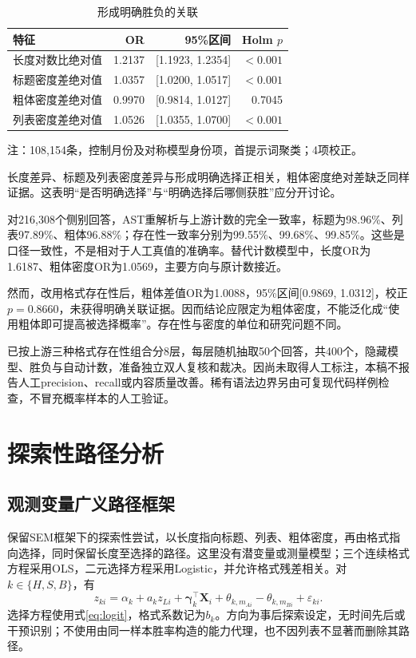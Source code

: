 \documentclass[UTF8,11pt,a4paper,fontset=windows]{ctexart}
\numberwithin{equation}{section}
\begin{document}
\begin{table}[htbp]\centering\small\caption{形成明确胜负的关联}\label{tab:decisive}
\begin{tabular}{lrrr}\toprule
特征 & OR & 95\%区间 & Holm $p$\\\midrule
长度对数比绝对值 & 1.2137 & [1.1923, 1.2354] & $<0.001$\\
标题密度差绝对值 & 1.0357 & [1.0200, 1.0517] & $<0.001$\\
粗体密度差绝对值 & 0.9970 & [0.9814, 1.0127] & 0.7045\\
列表密度差绝对值 & 1.0526 & [1.0355, 1.0700] & $<0.001$\\\bottomrule\end{tabular}
\par\smallskip\footnotesize 注：108,154条，控制月份及对称模型身份项，首提示词聚类；4项校正。
\end{table}

长度差异、标题及列表密度差异与形成明确选择正相关，粗体密度绝对差缺乏同样证据。这表明“是否明确选择”与“明确选择后哪侧获胜”应分开讨论。

对216,308个侧别回答，AST重解析与上游计数的完全一致率，标题为98.96\%、列表97.89\%、粗体96.88\%；存在性一致率分别为99.55\%、99.68\%、99.85\%。这些是口径一致性，不是相对于人工真值的准确率。替代计数模型中，长度OR为1.6187、粗体密度OR为1.0569，主要方向与原计数接近。

然而，改用格式存在性后，粗体差值OR为1.0088，95\%区间[0.9869, 1.0312]，校正$p=0.8660$，未获得明确关联证据。因而结论应限定为粗体密度，不能泛化成“使用粗体即可提高被选择概率”。存在性与密度的单位和研究问题不同。

已按上游三种格式存在性组合分8层，每层随机抽取50个回答，共400个，隐藏模型、胜负与自动计数，准备独立双人复核和裁决。因尚未取得人工标注，本稿不报告人工precision、recall或内容质量改善。稀有语法边界另由可复现代码样例检查，不冒充概率样本的人工验证。

\FloatBarrier
\section{探索性路径分析}
\subsection{观测变量广义路径框架}
保留SEM框架下的探索性尝试，以长度指向标题、列表、粗体密度，再由格式指向选择，同时保留长度至选择的路径。这里没有潜变量或测量模型；三个连续格式方程采用OLS，二元选择方程采用Logistic，并允许格式残差相关。对$k\in\{H,S,B\}$，有
\begin{equation}
 z_{ki}=\alpha_k+a_kz_{Li}+\bm\gamma_k^\top\bm X_i
 +\theta_{k,m_{Ai}}-\theta_{k,m_{Bi}}+\varepsilon_{ki}.
\end{equation}
选择方程使用式\eqref{eq:logit}，格式系数记为$b_k$。方向为事后探索设定，无时间先后或干预识别；不使用由同一样本胜率构造的能力代理，也不因列表不显著而删除其路径。
\end{document}
